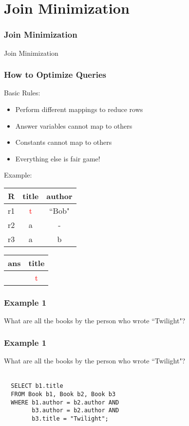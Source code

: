 \documentclass{beamer}
\begin{document}
\section{Join Minimization}
\begin{frame}
  \frametitle{Join Minimization}
  Join Minimization
\end{frame}

\begin{frame}
  \frametitle{How to Optimize Queries}
  Basic Rules:
  \begin{itemize}
    \item Perform different mappings to reduce rows
    \item Answer variables cannot map to others
    \item Constants cannot map to others
    \item Everything else is fair game!
  \end{itemize}
Example:
  
  \begin{tabular}{ c | c c }
  R & title & author \\
  \hline
  r1 & \textcolor{red}{t} & ``Bob" \\
  r2 & a & - \\
  r3 & a & b
  \end{tabular}  
  \begin{tabular}{c|c}
  ans & title\\
  \hline 
  & \textcolor{red}{t} 
  \end{tabular}
\end{frame}

\begin{frame}
  \frametitle{Example 1}
  What are all the books by the person who wrote ``Twilight"?
\end{frame}

\begin{frame}[fragile]
  \frametitle{Example 1}
  What are all the books by the person who wrote ``Twilight"?\\
  \hfill \\
\begin{verbatim} 
  SELECT b1.title
  FROM Book b1, Book b2, Book b3
  WHERE b1.author = b2.author AND
        b3.author = b2.author AND
        b3.title = "Twilight";
\end{verbatim}

\end{frame}
\end{document}
